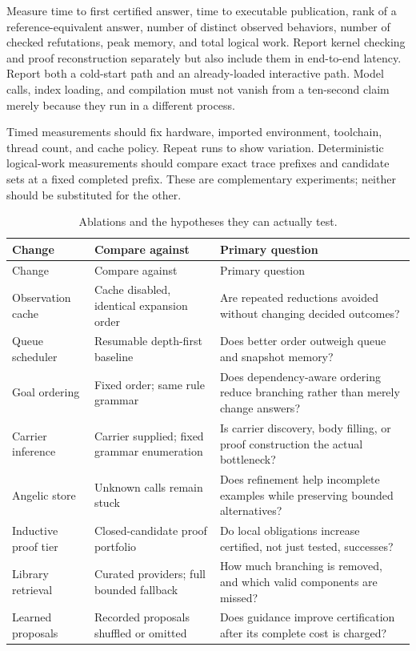Measure time to first certified answer, time to executable publication, rank
of a reference-equivalent answer, number of distinct observed behaviors,
number of checked refutations, peak memory, and total logical work. Report
kernel checking and proof reconstruction separately but also include them in
end-to-end latency. Report both a cold-start path and an already-loaded
interactive path. Model calls, index loading, and compilation must not vanish
from a ten-second claim merely because they run in a different process.

Timed measurements should fix hardware, imported environment, toolchain,
thread count, and cache policy. Repeat runs to show variation. Deterministic
logical-work measurements should compare exact trace prefixes and candidate
sets at a fixed completed prefix. These are complementary experiments; neither
should be substituted for the other.

\begin{longtable}{@{}L{30mm}L{58mm}L{64mm}@{}}
\caption{Ablations and the hypotheses they can actually test.}\label{tab:ablations}\\
\toprule
Change & Compare against & Primary question\\
\midrule
\endfirsthead
\toprule Change & Compare against & Primary question\\\midrule
\endhead
Observation cache & Cache disabled, identical expansion order & Are repeated reductions avoided without changing decided outcomes?\\[4pt]
Queue scheduler & Resumable depth-first baseline & Does better order outweigh queue and snapshot memory?\\[4pt]
Goal ordering & Fixed order; same rule grammar & Does dependency-aware ordering reduce branching rather than merely change answers?\\[4pt]
Carrier inference & Carrier supplied; fixed grammar enumeration & Is carrier discovery, body filling, or proof construction the actual bottleneck?\\[4pt]
Angelic store & Unknown calls remain stuck & Does refinement help incomplete examples while preserving bounded alternatives?\\[4pt]
Inductive proof tier & Closed-candidate proof portfolio & Do local obligations increase certified, not just tested, successes?\\[4pt]
Library retrieval & Curated providers; full bounded fallback & How much branching is removed, and which valid components are missed?\\[4pt]
Learned proposals & Recorded proposals shuffled or omitted & Does guidance improve certification after its complete cost is charged?\\
\bottomrule
\end{longtable}

